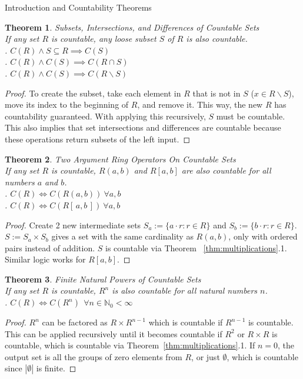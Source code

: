 \documentclass[12pt]{article}
\newtheorem{thm}{Theorem}
\begin{document}
\begin{section}{Introduction and Countability Theorems}
	\begin{thm}\label{thm:subsets}
		\emph{
			Subsets, Intersections, and Differences of Countable Sets\\
			\indent If any set $R$ is countable, any loose subset $S$ of $R$ is also countable.
			\vspace{0.4em}\\
			. $C(R)\land S\subseteq R\implies C(S)$\\
			. $C(R)\land C(S)\implies C(R\cap S)$\\
			. $C(R)\land C(S)\implies C(R\smallsetminus S)$
		}
	\end{thm}\begin{proof}
		To create the subset, take each element in $R$ that is not in $S$ ($x\in R
		\smallsetminus S$), move its index to the beginning of $R$, and remove it. This way, the
		new $R$ has countability guaranteed. With applying this recursively, $S$ must be
		countable. This also implies that set intersections and differences are countable because
		these operations return subsets of the left input.
	\end{proof}

	\begin{thm}\label{thm:rings}
		\emph{
			Two Argument Ring Operators On Countable Sets\\
			\indent If any set $R$ is countable, $R(a, b)$ and $R[a, b]$ are also countable
			for all numbers $a$ and $b$.\vspace{0.4em}\\
			. $C(R)\iff C(R(a, b))~\forall a,b$\\
			. $C(R)\iff C(R[\,a, b\,])~\forall a,b$
		}
	\end{thm}\begin{proof}
		Create 2 new intermediate sets $S_a := \{a\cdot r:r\in R\}$ and $S_b := \{b\cdot r:r\in
		R\}$. $S:=S_a\times S_b$ gives a set with the same cardinality as $R(a,b)$, only with
		ordered pairs instead of addition. $S$ is countable via Theorem~
		\ref{thm:multiplications}.1. Similar logic works for $R[a,b]$.
	\end{proof}

	\begin{thm}\label{thm:powers}
		\emph{
			Finite Natural Powers of Countable Sets\\
			\indent If any set $R$ is countable, $R^n$ is also countable for all natural
			numbers $n$.\vspace{0.4em}\\
			. $C(R)\iff C(R^n)~~\forall n\in\mathbb N_0<\infty$
		}
	\end{thm}\begin{proof}
		$R^n$ can be factored as $R\times R^{n-1}$ which is countable if $R^{n-1}$ is countable. This can be applied recursively until it becomes countable if $R^2$ or $R\times R$ is
		countable, which is countable via Theorem~\ref{thm:multiplications}.1. If $n=0$, the
		output set is all the groups of zero elements from $R$, or just $\emptyset$, which is countable
		since $\left|\emptyset\right|$ is finite.
	\end{proof}


\end{section}
\end{document}
